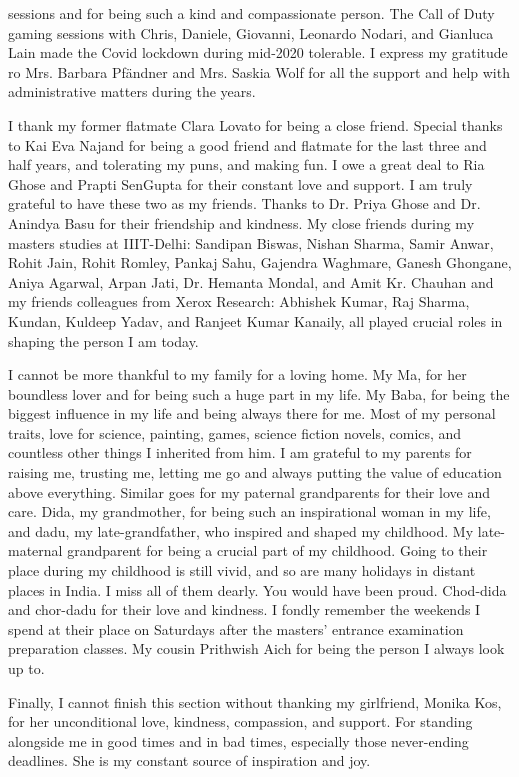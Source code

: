 sessions and for being such a kind and compassionate person. The Call of Duty gaming sessions with Chris, Daniele, Giovanni, Leonardo Nodari, and Gianluca Lain made the Covid lockdown during mid-2020 tolerable. I express my gratitude ro Mrs. Barbara Pf\"andner and Mrs. Saskia Wolf for all the support and help with administrative matters during the years. 


I thank my former flatmate Clara Lovato for being a close friend. Special thanks to Kai Eva Najand for being a good friend and flatmate for the last three and half years, and tolerating my puns, and making fun. I owe a great deal to Ria Ghose and Prapti SenGupta for their constant love and support. I am truly grateful to have these two as my friends. Thanks to Dr. Priya Ghose and Dr. Anindya Basu for their friendship and kindness. My close friends during my masters studies at IIIT-Delhi: Sandipan Biswas, Nishan Sharma, Samir Anwar, Rohit Jain, Rohit Romley, Pankaj Sahu, Gajendra Waghmare, Ganesh Ghongane, Aniya Agarwal, Arpan Jati, Dr. Hemanta Mondal, and Amit Kr. Chauhan and my friends colleagues from Xerox Research: Abhishek Kumar, Raj Sharma, Kundan, Kuldeep Yadav, and Ranjeet Kumar Kanaily, all played crucial roles in shaping the person I am today.


I cannot be more thankful to my family for a loving home. My Ma, for her boundless lover and for being such a huge part in my life. My Baba, for being the biggest influence in my life and being always there for me. Most of my personal traits, love for science, painting, games, science fiction novels, comics, and countless other things I inherited from him. I am grateful to my parents for raising me, trusting me, letting me go and always putting the value of education above everything. Similar goes for my paternal grandparents for their love and care. Dida, my grandmother, for being such an inspirational woman in my life, and dadu, my late-grandfather, who inspired and shaped my childhood. My late-maternal grandparent for being a crucial part of my childhood. Going to their place during my childhood is still vivid, and so are many holidays in distant places in India. I miss all of them dearly. You would have been proud. Chod-dida and chor-dadu for their love and kindness. I fondly remember the weekends I spend at their place on Saturdays after the masters' entrance examination preparation classes. My cousin Prithwish Aich for being the person I always look up to.


Finally, I cannot finish this section without thanking my girlfriend, Monika Kos, for her unconditional love, kindness, compassion, and support. For standing alongside me in good times and in bad times, especially those never-ending deadlines. She is my constant source of inspiration and joy.



\endgroup
